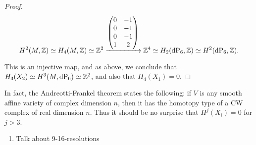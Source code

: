 \begin{proof}
\[
H^2(M,\Z) \simeq H_4(M,\Z) \simeq \Z^2 \xrightarrow{
	\begin{pmatrix}
	0 & -1 \\
	0 & -1 \\
	0 & -1  \\
	1 & 2 
	\end{pmatrix}
} \Z^4 \simeq H_2(\dP6,\Z) \simeq H^2(\dP6,\Z).
\]

This is an injective map, and as above, we conclude that $H_3(X_2) \simeq H^3(M,\dP6) \simeq \Z^2$, and also that $H_4(X_1)=0$.


\end{proof}

\begin{remark}
In fact, the Andreotti-Frankel theorem \cite{andreotti_affinecw} states the following: if $V$ is any smooth affine variety of complex dimension $n$, then it has the homotopy type of a CW complex of real dimension $n$. Thus it should be no surprise that $H^j(X_i)=0$ for $j > 3$.
\end{remark}
 

\begin{enumerate}
	\item Talk about 9-16-resolutions
\end{enumerate}

